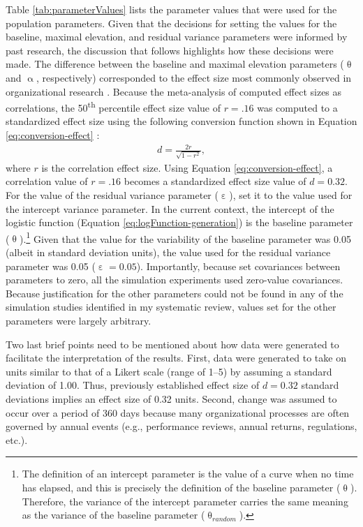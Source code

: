 \documentclass[
12pt, %
twoside,
english]{guelphthesis}
\begin{document}
Table \ref{tab:parameterValues} lists the parameter values that were used for the population parameters. Given that the decisions for setting the values for the baseline, maximal elevation, and residual variance parameters were informed by past research, the discussion that follows highlights how these decisions were made. The difference between the baseline and maximal elevation parameters (\(\uptheta\) and \(\upalpha\), respectively) corresponded to the effect size most commonly observed in organizational research \autocite[i.e., the 50\textsuperscript{th} percentile effect size value;][]{bosco2015}. Because the meta-analysis of \textcite{bosco2015} computed effect sizes as correlations, the 50\textsuperscript{th} percentile effect size value of \(r = .16\) was computed to a standardized effect size using the following conversion function shown in Equation \ref{eq:conversion-effect} \autocite[Chapter 7]{borenstein2009}:
\begin{align}
d = \frac{2r}{\sqrt{1 - r^2}}, 
\label{eq:conversion-effect}
\end{align}
\noindent where \(r\) is the correlation effect size. Using Equation \ref{eq:conversion-effect}, a correlation value of \(r = .16\) becomes a standardized effect size value of \(d = 0.32\). For the value of the residual variance parameter (\(\upepsilon\)), \textcite{coulombe2016} set it to the value used for the intercept variance parameter. In the current context, the intercept of the logistic function (Equation \ref{eq:logFunction-generation}) is the baseline parameter (\(\uptheta\)).\footnote{The definition of an intercept parameter is the value of a curve when no time has elapsed, and this is precisely the definition of the baseline parameter ($\uptheta$). Therefore, the variance of the intercept parameter carries the same meaning as the variance of the baseline parameter ($\uptheta_{random}$).} Given that the value for the variability of the baseline parameter was 0.05 (albeit in standard deviation units), the value used for the residual variance parameter was 0.05 (\(\upepsilon = 0.05\)). Importantly, because \textcite{coulombe2016} set covariances between parameters to zero, all the simulation experiments used zero-value covariances. Because justification for the other parameters could not be found in any of the simulation studies identified in my systematic review, values set for the other parameters were largely arbitrary.

Two last brief points need to be mentioned about how data were generated to facilitate the interpretation of the results. First, data were generated to take on units similar to that of a Likert scale (range of 1--5) by assuming a standard deviation of 1.00. Thus, previously established effect size of \(d = 0.32\) standard deviations implies an effect size of 0.32 units. Second, change was assumed to occur over a period of 360 days because many organizational processes are often governed by annual events (e.g., performance reviews, annual returns, regulations, etc.).
\end{document}

